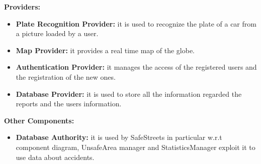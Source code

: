 \documentclass[../RASD.tex]{subfiles}
\begin{document}
    \textbf{Providers:}
    \\
    \begin{itemize}
        \item \textbf{Plate Recognition Provider:} it is used to recognize the plate of a car from a picture loaded by a user.
        \item \textbf{Map Provider:} it provides a real time map of the globe.
        \item \textbf{Authentication Provider:} it manages the access of the registered users and the registration of the new ones.
        \item \textbf{Database Provider:} it is used to store all the information regarded the reports and the users information.
    \end{itemize}
    \textbf{Other Components:}
    \\
    \begin{itemize}
        \item \textbf{Database Authority:} it is used by SafeStreets in particular w.r.t component diagram, UnsafeArea manager and StatisticsManager
        exploit it to use data about accidents.
    \end{itemize}
    \newpage
\end{document}
